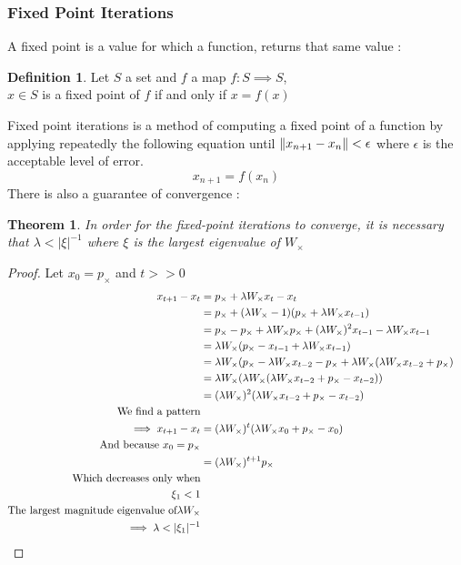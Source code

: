 \documentclass{article}
\DeclarePairedDelimiter{\norm}{\lVert}{\rVert}
\newtheorem{theorem}{Theorem}
\theoremstyle{definition}
\newtheorem{definition}{Definition}
\begin{document}
\subsubsection{Fixed Point Iterations}
A fixed point is a value for which a function, returns that same value :
\begin{definition}
	Let $S$ a set and $f$ a map $f : S \implies S$,\\
	$x \in S$ is a fixed point of $f$ if and only if $x=f(x)$ 
\end{definition}
Fixed point iterations is a method of computing a fixed point of a function by applying repeatedly the following equation until $\norm{x_{n+1}-x_{n}}<\epsilon$ where $\epsilon$ is the acceptable level of error.
\begin{equation}
	x_{n+1} = f(x_n)
\end{equation}
There is also a guarantee of convergence :
\begin{theorem}
	In order for the fixed-point iterations to converge, it is necessary that $\lambda<|\xi|^{-1}$ where $\xi$ is the largest eigenvalue of $W_\times$
\end{theorem}
\begin{proof}
  Let $x_0=p_\times$ and $t>>0$
  \begin{align*}
      x_{t+1}-x_t &= p_\times+\lambda W_{\times} x_t - x_t &\\
      &= p_{\times}+(\lambda W_{\times} - 1)(p_{\times}+\lambda W_{\times} x_{t-1})\\
      &= p_{\times} - p_{\times} + \lambda W_{\times}p_{\times} + (\lambda W_{\times})^2 x_{t-1} - \lambda W_{\times} x_{t-1}\\
      &= \lambda W_{\times}(p_{\times}-x_{t-1}+\lambda W_{\times} x_{t-1}) \\
      &= \lambda W_{\times}(p_{\times}-\lambda W_{\times} x_{t-2} - p_{\times} + \lambda W_{\times}(\lambda W_{\times} x_{t-2} +p_{\times}) \\
      &= \lambda W_{\times} ( \lambda W_{\times} (\lambda W_{\times} x_{t-2}+p_{\times}-x_{t-2})) \\
      &= (\lambda W_{\times})^2(\lambda W_{\times} x_{t-2}+p_{\times} - x_{t-2}) & \\
      \text{We find a pattern}\\
      \implies x_{t+1}-x_t &= (\lambda W_{\times})^t (\lambda W_{\times} x_0 + p_{\times} - x_0) & \\
      \text{And because } x_0 = p_{\times}\\
      &= (\lambda W_{\times})^{t+1} p_{\times}\\
      \text{Which decreases only when}\\
      \xi_1 < 1\\
      \text{The largest magnitude eigenvalue of} \lambda W_{\times}\\
      \implies \lambda < |\xi_1|^{-1}
      && \qedhere
  \end{align*}
\end{proof}
\end{document}
